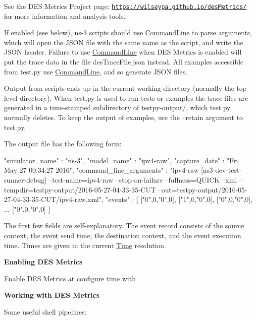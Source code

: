 See the D\+ES Metrics Project page\+: \href{https://wilseypa.github.io/desMetrics/}{\tt https\+://wilseypa.\+github.\+io/des\+Metrics/} for more information and analysis tools.

If enabled (see below), ns-\/3 scripts should use \hyperlink{classns3_1_1CommandLine}{Command\+Line} to parse arguments, which will open the J\+S\+ON file with the same name as the script, and write the J\+S\+ON header. Failure to use \hyperlink{classns3_1_1CommandLine}{Command\+Line} when D\+ES Metrics is enabled will put the trace data in the file {\ttfamily des\+Trace\+File.\+json} instead. All examples accessible from {\ttfamily test.\+py} use \hyperlink{classns3_1_1CommandLine}{Command\+Line}, and so generate J\+S\+ON files.

Output from scripts ends up in the current working directory (normally the top level directory). When {\ttfamily test.\+py} is used to run tests or examples the trace files are generated in a time-\/stamped subdirectory of {\ttfamily testpy-\/output/}, which {\ttfamily test.\+py} normally deletes. To keep the output of examples, use the {\ttfamily --retain} argument to {\ttfamily test.\+py}.

The output file has the following form\+: \begin{DoxyVerb}{
 "simulator_name" : "ns-3",
 "model_name" : "ipv4-raw",
 "capture_date" : "Fri May 27 00:34:27 2016",
 "command_line_arguments" : "ipv4-raw [ns3-dev-test-runner-debug] --test-name=ipv4-raw --stop-on-failure --fullness=QUICK --xml --tempdir=testpy-output/2016-05-27-04-33-35-CUT --out=testpy-output/2016-05-27-04-33-35-CUT/ipv4-raw.xml",
 "events" : [
  ["0",0,"0",0],
  ["1",0,"0",0],
  ["0",0,"0",0],
  ...
  ["0",0,"0",0]
 ]
} \end{DoxyVerb}
 The first few fields are self-\/explanatory. The {\ttfamily event} record consists of the source context, the event send time, the destination context, and the event execution time. Times are given in the current \hyperlink{classns3_1_1Time}{Time} resolution.

{\bfseries  Enabling D\+ES Metrics }

Enable D\+ES Metrics at configure time with 


{\bfseries  Working with D\+ES Metrics }

Some useful shell pipelines\+:

